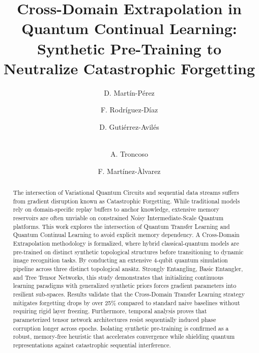 \documentclass[runningheads]{llncs}
\begin{document}
\title{Cross-Domain Extrapolation in Quantum Continual Learning: Synthetic Pre-Training to Neutralize Catastrophic Forgetting}

\author{D. Mart\'in-P\'erez \and
F. Rodr\'iguez-D\'iaz \and D. Guti\'errez-Avil\'es\orcidlink{ } \and \\
A. Troncoso \and
F. Mart\'inez-\`Alvarez}



\maketitle

\begin{abstract}
The intersection of Variational Quantum Circuits and sequential data streams suffers from gradient disruption known as Catastrophic Forgetting. While traditional models rely on domain-specific replay buffers to anchor knowledge, extensive memory reservoirs are often unviable on constrained Noisy Intermediate-Scale Quantum platforms. This work explores the intersection of Quantum Transfer Learning and Quantum Continual Learning to avoid explicit memory dependency. A Cross-Domain Extrapolation methodology is formalized, where hybrid classical-quantum models are pre-trained on distinct synthetic topological structures before transitioning to dynamic image recognition tasks. By conducting an extensive 4-qubit quantum simulation pipeline across three distinct topological ans\"atz. Strongly Entangling, Basic Entangler, and Tree Tensor Networks, this study demonstrates that initializing continuous learning paradigms with generalized synthetic priors forces gradient parameters into resilient sub-spaces. Results validate that the Cross-Domain Transfer Learning strategy mitigates forgetting drops by over 25\% compared to standard naive baselines without requiring rigid layer freezing. Furthermore, temporal analysis proves that parameterized tensor network architectures resist sequentially induced phase corruption longer across epochs. Isolating synthetic pre-training is confirmed as a robust, memory-free heuristic that accelerates convergence while shielding quantum representations against catastrophic sequential interference.
\end{abstract}
\end{document}

